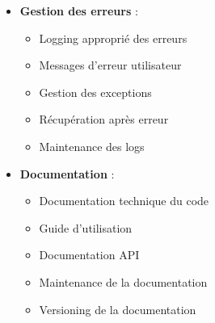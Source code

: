 \documentclass[12pt,a4paper]{article}
\begin{document}
\begin{itemize}
    \item \textbf{Gestion des erreurs} :
    \begin{itemize}
        \item Logging approprié des erreurs
        \item Messages d'erreur utilisateur
        \item Gestion des exceptions
        \item Récupération après erreur
        \item Maintenance des logs
    \end{itemize}

    \item \textbf{Documentation} :
    \begin{itemize}
        \item Documentation technique du code
        \item Guide d'utilisation
        \item Documentation API
        \item Maintenance de la documentation
        \item Versioning de la documentation
    \end{itemize}
\end{itemize}
\end{document}
